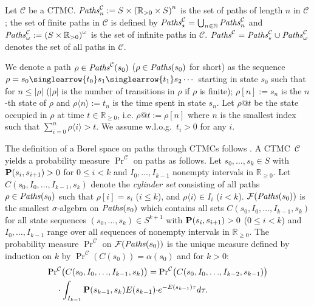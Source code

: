 \documentclass{LMCS}
\newcommand{\mc}[1]{\mathcal{#1}}
\newcommand{\<}{\langle}
\renewcommand{\>}{\rangle}
\newcommand{\ges}{\geqslant}
\newcommand{\CTMC}{\textsc{{CTMC}}}
\newcommand{\mv}[1]{\singlearrow{#1}}
\renewcommand{\P}{{\bf P}}
\newcommand{\Paths}{{\it Paths}}
\newcommand{\Nats}{\mathbb{N}}
\newcommand{\Reals}{\mathbb{R}}
\begin{document}
\begin{defi}
Let $\mc{C}$ be a \CTMC.
$\Paths^{\mc{C}}_n:=S\times{\left(\Reals_{> 0}\times S\right)}^n$
is the set of paths of length $n$ in $\mc{C}$; the set of finite
paths in $\mc{C}$ is defined by
$\Paths^{\mc{C}}_{\star}=\bigcup_{n\in\Nats}\Paths^{\mc{C}}_n$
and $\Paths^{\mc{C}}_{\omega}:={\left(S\times\Reals_{>
0}\right)}^\omega$ is the set of infinite paths in $\mc{C}$.
$\Paths^{\mc{C}}=\Paths^{\mc{C}}_{\star}\cup\Paths^{\mc{C}}_{\omega}$
denotes the set of all paths in $\mc{C}$.
\end{defi}

We denote a path $\rho\in\Paths^{\mc{C}}(s_0)$
($\rho\in\Paths(s_0)$ for short) as the sequence
$\rho=s_0\mv{t_0}s_1\mv{t_1}s_2 \cdots$ starting in state $s_0$
such that for $n\leqslant|\rho|$ ($|\rho|$ is the number of
transitions in $\rho$ if $\rho$ is finite); $\rho[n]:=s_n$ is the
$n$-th state of $\rho$ and $\rho\<n\>:=t_n$ is the time spent in
state $s_n$. Let $\rho@t$ be the state occupied in $\rho$ at
time $t\in\Reals_{\geqslant 0}$, i.e. $\rho@t:=\rho[n]$ where $n$ is
the smallest index such that $\sum_{i=0}^{n}\rho\<i\>
> t$. We assume w.l.o.g.\ $t_i>0$ for any $i$.

The definition of a Borel space on paths through \CTMC s follows
\cite{Var85,BHHK03}. A \CTMC\ $\mc{C}$ yields a probability measure ${\Pr}^\mc{C}$ on paths as
follows.  Let $s_0, \ldots\!, s_k\in S$ with $\P(s_i, s_{i+1})>0$
for $0\leqslant i<k$ and $I_0, \ldots\!, I_{k-1}$ nonempty
intervals in $\Reals_{\ges 0}$.
Let $C(s_0, I_0, \ldots\!, I_{k-1}, s_k)$ denote the \emph{cylinder
set} consisting of all paths $\rho\in\Paths(s_0)$ such that
$\rho[i]=s_i$ ($i\leqslant k$), and $\rho\<i\>\in I_i$ ($i<k$).
$\mc{F}(\Paths(s_0))$ is the smallest $\sigma$-algebra on
$\Paths(s_0)$ which contains all sets $C(s_0, I_0, \ldots\!, I_{k-1},
s_k)$ for all state sequences $(s_0,\ldots\!,s_k)\in S^{k+1}$ with
$\P(s_i, s_{i+1})>0$ ($0\leqslant i<k$) and $I_0, \ldots\!, I_{k-1}$
range over all sequences of nonempty intervals in $\Reals_{\ges 0}$.
The probability measure ${\Pr}^\mc{C}$ on $\mc{F}(\Paths(s_0))$
is the unique measure defined by induction on $k$ by
${\Pr}^{\mc{C}}(C(s_0))=\alpha(s_0)$ and for $k> 0$:
\begin{align}\label{eqn:ctmc}
&{\Pr}^{\mc{C}}\big(C(s_0, I_0, \ldots\!, I_{k-1}, s_k)\big)=
{\Pr}^{\mc{C}}\big(C(s_0, I_0, \ldots\!, I_{k-2}, s_{k-1})\big)\nonumber\\
& \quad
\cdot\int_{I_{k-1}}\P(s_{k-1},s_k)E(s_{k-1}){\cdot}e^{-E(s_{k-1})\tau}d\tau.
\end{align}
\end{document}
